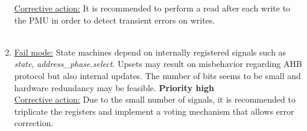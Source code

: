 \begin{enumerate}
\underline{Corrective action:} It is recommended to perform a read after each write to the PMU in order to detect transient errors on writes.\\
\\
\item \underline{Fail mode:} State machines depend on internally registered signals such as \textit{ state}, \textit{address\_phase.select}. Upsets may result on misbehavior regarding AHB protocol but also  internal updates. The number of bits seems to be small and hardware redundancy may be feasible. \textbf{Priority high}\\
\underline{Corrective action:} Due to the small number of signals, it is recommended to triplicate the registers and implement a voting mechanism that allows error correction.\\
 
\end{enumerate}
